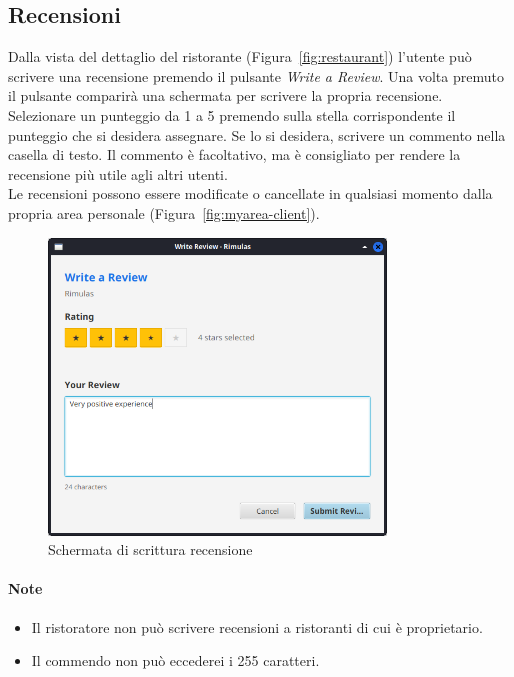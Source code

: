 \subsection{Recensioni}
Dalla vista del dettaglio del ristorante (Figura~\ref{fig:restaurant})
l'utente può scrivere una recensione premendo il pulsante 
\emph{Write a Review}. 
Una volta premuto il pulsante comparirà una schermata per scrivere 
la propria recensione.\\
Selezionare un punteggio da 1 a 5 premendo sulla stella corrispondente
il punteggio che si desidera assegnare.
Se lo si desidera, scrivere un commento nella casella di testo.
Il commento è facoltativo, ma è consigliato per rendere la recensione
più utile agli altri utenti.\\
Le recensioni possono essere modificate o cancellate in qualsiasi 
momento dalla propria area personale (Figura~\ref{fig:myarea-client}).
\begin{figure}[H]
    \centering
    \includegraphics[width=0.8\textwidth]{images/review.png}
    \caption{Schermata di scrittura recensione}
    \label{fig:review}
\end{figure}
\paragraph{Note}
\begin{itemize}
    \item Il ristoratore non può scrivere recensioni a ristoranti di cui è 
    proprietario.
    \item Il commendo non può eccederei i 255 caratteri.
\end{itemize}

